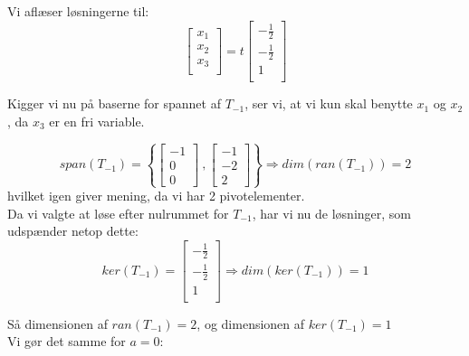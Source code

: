 \documentclass[a4paper,12pt]{article}
\begin{document}
Vi aflæser løsningerne til:\\
\[
\left[\begin{array}{ccc}
    x_1\\
    x_2\\
    x_3\\
\end{array}\right]
=
t
\left[\begin{array}{ccc}
    -\frac{1}{2}\\
    -\frac{1}{2}\\
    1\\
\end{array}\right]
\]

Kigger vi nu på baserne for spannet af $T_{-1}$, ser vi, at vi kun skal benytte $x_1$ og $x_2$, da $x_3$ er en fri variable. 

\[
span(T_{-1}) = \left\{ 
\left[\begin{array}{ccc|c}
    -1 \\
    0   \\
    0  
\end{array}\right]\
,
\left[\begin{array}{ccc|c}
    -1 \\
    -2   \\
    2  
\end{array}\right]
\right\}
\Rightarrow
dim(ran(T_{-1})) = 2
\]
hvilket igen giver mening, da vi har 2 pivotelementer.\\

Da vi valgte at løse efter nulrummet for $T_{-1}$, har vi nu de løsninger, som udspænder netop dette:\\

\[
ker(T_{-1}) = 
\left[\begin{array}{ccc}
    -\frac{1}{2}\\
    -\frac{1}{2}\\
    1\\
\end{array}\right]
\Rightarrow
dim(ker(T_{-1})) = 1
\]

Så dimensionen af $ran(T_{-1}) = 2$, og dimensionen af $ker(T_{-1}) = 1$\\

Vi gør det samme for $a= 0$:\\
\end{document}

